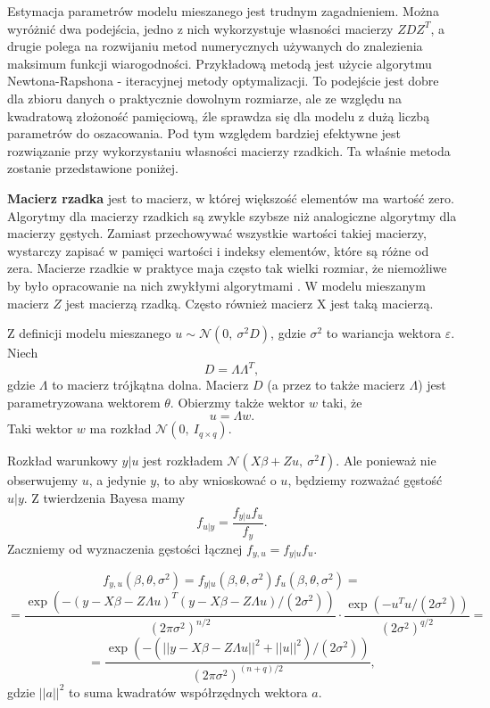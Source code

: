 \documentclass[12pt]{mwbk}
\theoremstyle{plain}
\theoremstyle{definition}
\theoremstyle{definition}
\begin{document}
Estymacja parametrów modelu mieszanego jest trudnym zagadnieniem. Można wyróżnić dwa podejścia, jedno z nich wykorzystuje własności macierzy $ZDZ^T$, a drugie polega na rozwijaniu metod numerycznych używanych do znalezienia maksimum funkcji wiarogodności. Przykładową metodą jest użycie algorytmu Newtona-Rapshona - iteracyjnej metody optymalizacji. To podejście jest dobre dla zbioru danych o praktycznie dowolnym rozmiarze, ale ze względu na kwadratową złożoność pamięciową, źle sprawdza się dla modelu z dużą liczbą parametrów do oszacowania. Pod tym względem bardziej efektywne jest rozwiązanie przy wykorzystaniu własności macierzy rzadkich. Ta właśnie metoda zostanie przedstawione poniżej.

\textbf{Macierz rzadka} jest to macierz, w której większość elementów ma wartość zero. Algorytmy dla macierzy rzadkich są zwykle szybsze niż analogiczne algorytmy dla macierzy gęstych. Zamiast przechowywać wszystkie wartości takiej macierzy, wystarczy zapisać w pamięci wartości i indeksy elementów, które są różne od zera. Macierze rzadkie w praktyce maja często tak wielki rozmiar, że niemożliwe by było opracowanie na nich zwykłymi algorytmami \cite{rzadka}. W modelu mieszanym macierz $Z$ jest macierzą rzadką. Często również macierz X jest taką macierzą.

Z definicji modelu mieszanego $u \sim \mathcal{N}(0,~\sigma^2D)$, gdzie $\sigma^2$ to wariancja wektora $\varepsilon$. Niech $$D=\Lambda \Lambda^T,$$ gdzie $\Lambda$ to macierz trójkątna dolna. Macierz $D$ (a przez to także macierz $\Lambda$) jest parametryzowana wektorem $\theta$. Obierzmy także wektor $w$ taki, że $$u=\Lambda w.$$ Taki wektor $w$ ma rozkład $\mathcal{N}(0,~I_{q \times q})$.



Rozkład warunkowy $y|u$ jest rozkładem $\mathcal{N}(X\beta+Zu,~\sigma^2I)$. Ale ponieważ nie obserwujemy $u$, a jedynie $y$, to aby wnioskować o $u$, będziemy rozważać gęstość $u|y$. Z twierdzenia Bayesa \cite{bayes} mamy $$f_{u|y}=\frac{f_{y|u}f_u}{f_y}.$$ Zaczniemy od wyznaczenia gęstości łącznej $f_{y,u}=f_{y|u}f_u$.

$$f_{y,u}(\beta, \theta, \sigma^2)=f_{y|u}(\beta, \theta, \sigma^2)f_u(\beta, \theta, \sigma^2)=$$
$$=\frac{\exp(-(y-X\beta -Z \Lambda u)^T(y-X\beta-Z\Lambda u)/(2\sigma^2))}{(2\pi \sigma^2)^{n/2}}\cdot \frac{\exp(-u^Tu/(2\sigma^2))}{(2\sigma^2)^{q/2}}=$$
$$=\frac{\exp(-(||y-X\beta-Z\Lambda u||^2+||u||^2)/(2\sigma^2))}{(2\pi \sigma^2)^{(n+q)/2}},$$ gdzie $||a||^2$ to suma kwadratów współrzędnych wektora $a$.
\end{document}
